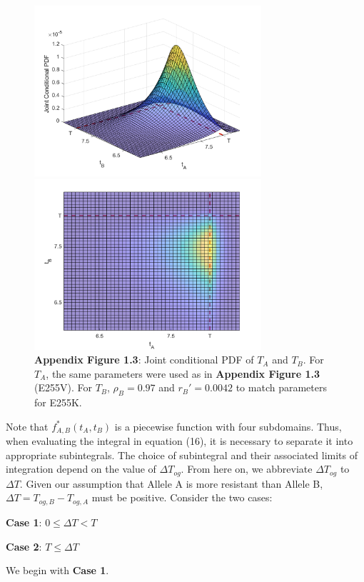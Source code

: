 \documentclass{article}
\begin{document}
\begin{figure}
\includegraphics[width=0.75\textwidth]{JointPDF1}
\includegraphics[width=0.75\textwidth]{JointPDF2}
\centering
\\
\textbf{Appendix Figure 1.3}: Joint conditional PDF of $T_{A}$ and $T_{B}$.  For $T_{A}$, the same parameters were used as in \textbf{Appendix Figure 1.3} (E255V).  For $T_{B}$, $\rho_B = 0.97$ and $r_B' = 0.0042$ to match parameters for E255K.
\end{figure}
\FloatBarrier

Note that $f_{A,B}^*(t_{A},t_{B})$ is a piecewise function with four subdomains.  Thus, when evaluating the integral in equation (16), it is necessary to separate it into appropriate subintegrals.  The choice of subintegral and their associated limits of integration depend on the value of $\Delta T_{og}$.  From here on, we abbreviate $\Delta T_{og}$ to $\Delta T$.  Given our assumption that Allele A is more resistant than Allele B, $\Delta T = T_{og,B} - T_{og,A}$ must be positive. Consider the two cases:
\begin{description}
\item{\textbf{Case 1}: $0 \leq \Delta T < T$}
\item{\textbf{Case 2}: $T \leq \Delta T$}
\end{description}
We begin with \textbf{Case 1}.
\end{document}
